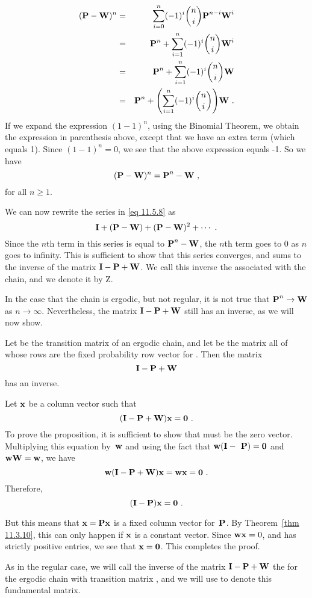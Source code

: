 \begin{eqnarray*}
({\mbox{\bf P}\/} - {\mbox{\bf W}\/})^n &=& \sum_{i = 0}^n (-1)^i{n \choose i}{\mbox{\bf P}\/}^{n-i}{\mbox{\bf W}\/}^i \\
&=& {\mbox{\bf P}\/}^n + \sum_{i = 1}^n (-1)^i{n \choose i} {\mbox{\bf W}\/}^i \\
&=& {\mbox{\bf P}\/}^n + \sum_{i = 1}^n (-1)^i{n \choose i} {\mbox{\bf W}\/} \\
&=& {\mbox{\bf P}\/}^n + \Biggl(\sum_{i = 1}^n (-1)^i{n \choose i}\Biggr) {\mbox{\bf W}\/}\ .
\end{eqnarray*}
If we expand the expression $(1-1)^n$, using the Binomial Theorem, we obtain
the expression in
parenthesis above, except that we have an extra term (which equals 1).  Since
$(1-1)^n = 0$,
we see that the above expression equals -1.  So we have
$$(\mat {P} - \mat {W})^n = \mat {P}^n - \mat {W}\ ,$$
for all $n \ge 1$.
\par
We can now rewrite the series in \ref{eq 11.5.8} as
$${\mbox{\bf I}\/} + ({\mbox{\bf P}\/} - {\mbox{\bf W}\/}) + ({\mbox{\bf P}\/} - {\mbox{\bf W}\/})^2 + \cdots\ .$$
Since the $n$th term in this series is equal to ${\mbox{\bf P}\/}^n - {\mbox{\bf W}\/}$, the
$n$th term goes
to 0 as $n$ goes to infinity.  This is sufficient to show that this series
converges, and
sums to the inverse of the matrix ${\mbox{\bf I}\/} - {\mbox{\bf P}\/} + {\mbox{\bf W}\/}$.  We call
this inverse the
 associated with the chain, and we denote it by \mat
{Z}.
\par
In the case that the chain is ergodic, but not regular, it is not true that
${\mbox{\bf P}\/}^n
\rightarrow {\mbox{\bf W}\/}$ as $n \rightarrow \infty$.  Nevertheless, the matrix
${\mbox{\bf I}\/} - {\mbox{\bf P}\/} + {\mbox{\bf W}\/}$ still has an inverse, as we will now show.

\begin{proposition}
Let  be the transition matrix of an ergodic chain, and let  be
the matrix all
of whose rows are the fixed probability row vector for .  Then the
matrix
$${\mbox{\bf I}\/} - {\mbox{\bf P}\/} + {\mbox{\bf W}\/}$$
has an inverse.

\proof
Let ${\mbox{\bf x}\/}$ be a column vector such that
$$
({\mbox{\bf I}\/} - {\mbox{\bf P}\/} + {\mbox{\bf W}\/}){\mbox{\bf x}\/} = {\mbox{\bf0}\/}\ .
$$
To prove the proposition, it is sufficient to show that  must be the
zero vector.
Multiplying this equation by~${\mbox{\bf w}\/}$ and using the fact that $\mat{w}(\mat{I}
- \mat{
P}) = \mat{0}$ and ${\mbox{\bf w}\/} {\mbox{\bf W}\/} = {\mbox{\bf w}\/}$, we have
$$
{\mbox{\bf w}\/}({\mbox{\bf I}\/} - {\mbox{\bf P}\/} + {\mbox{\bf W}\/}){\mbox{\bf x}\/} = {\mbox{\bf w}\/} {\mbox{\bf x}\/} = {\mbox{\bf0}\/}\ .
$$
Therefore,
$$
({\mbox{\bf I}\/} - {\mbox{\bf P}\/}){\mbox{\bf x}\/} = {\mbox{\bf0}\/}\ .
$$

But this means that ${\mbox{\bf x}\/} = {\mbox{\bf P}\/} {\mbox{\bf x}\/}$ is a fixed column vector
for~${\mbox{\bf P}\/}$. 
By Theorem~\ref{thm 11.3.10}, this can only happen if ${\mbox{\bf x}\/}$ is a constant
vector.  
Since ${\mbox{\bf w}\/}{\mbox{\bf x}\/} = 0$, and  has strictly positive entries, we
see that
${\mbox{\bf x}\/} = {\mbox{\bf0}\/}$.  This completes the proof.
\end{proposition}
\par
As in the regular case, we will call the inverse of the matrix ${\mbox{\bf I}\/} - {\mbox{\bf P}\/} + {\mbox{\bf W}\/}$
the  for the ergodic chain with transition
matrix , and we will
use  to denote this fundamental matrix.

